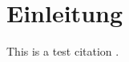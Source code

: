 \thispagestyle{plain}

\section{Einleitung}\label{introduction}

This is a test citation \cite{cry:2011}.
